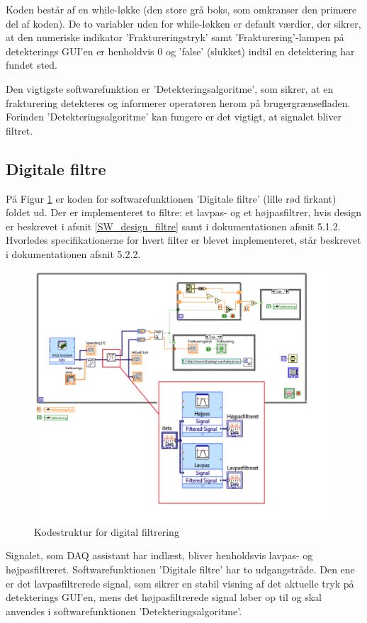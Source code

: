 Koden består af en while-løkke (den store grå boks, som omkranser den primære del af koden). De to variabler uden for while-løkken er default værdier, der sikrer, at den numeriske indikator 'Fraktureringstryk' samt 'Frakturering'-lampen på detekterings GUI'en er henholdvis 0 og 'false' (slukket) indtil en detektering har fundet sted. 

Den vigtigste softwarefunktion er 'Detekteringsalgoritme', som sikrer, at en frakturering detekteres og informerer operatøren herom på brugergrænsefladen. Forinden 'Detekteringsalgoritme' kan fungere er det vigtigt, at signalet bliver filtret. 


\subsection{Digitale filtre}
På Figur \ref{SW_2} er koden for softwarefunktionen 'Digitale filtre' (lille rød firkant) foldet ud. Der er implementeret to filtre: et lavpas- og et højpasfiltrer, hvis design er beskrevet i afsnit \ref{SW_design_filtre} samt i dokumentationen afsnit 5.1.2. Hvorledes specifikationerne for hvert filter er blevet implementeret, står beskrevet i dokumentationen afsnit 5.2.2. 


\begin{figure}[H]
	\centering
	\includegraphics[width=1\textwidth]{Figure/SW_3}
	\caption{Kodestruktur for digital filtrering}
	\label{SW_2}
\end{figure} 

Signalet, som DAQ assistant har indlæst, bliver henholdsvis lavpas- og højpasfiltreret. Softwarefunktionen 'Digitale filtre' har to udgangstråde. Den ene er det lavpasfiltrerede signal, som sikrer en stabil visning af det aktuelle tryk på detekterings GUI'en, mens det højpasfiltrerede signal løber op til og skal anvendes i softwarefunktionen 'Detekteringsalgoritme'. 

